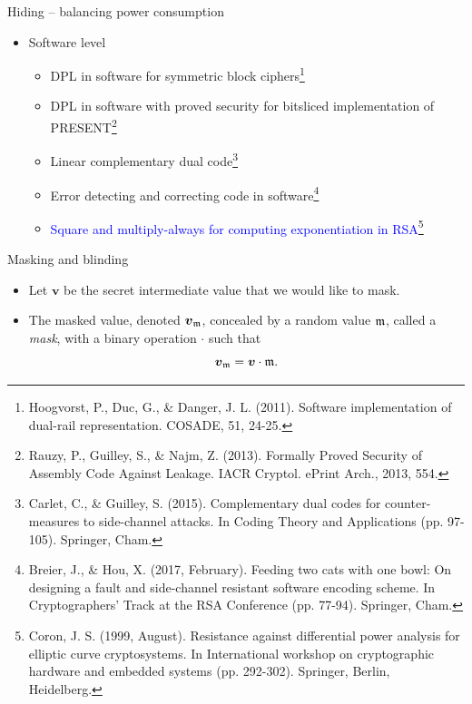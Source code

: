 \begin{frame}{Hiding -- balancing power consumption}
\begin{itemize}
    \item Software level
        \begin{itemize}
            \item DPL in software for symmetric block ciphers\footnote{Hoogvorst, P., Duc, G., \& Danger, J. L. (2011). Software implementation of dual-rail representation. COSADE, 51, 24-25.}
            \item DPL in software with proved security for bitsliced implementation of PRESENT\footnote{Rauzy, P., Guilley, S., \& Najm, Z. (2013). Formally Proved Security of Assembly Code Against Leakage. IACR Cryptol. ePrint Arch., 2013, 554.}
            \item Linear complementary dual code\footnote{Carlet, C., \& Guilley, S. (2015). Complementary dual codes for counter-measures to side-channel attacks. In Coding Theory and Applications (pp. 97-105). Springer, Cham.}
            \item Error detecting and correcting code in software\footnote{Breier, J., \& Hou, X. (2017, February). Feeding two cats with one bowl: On designing a fault and side-channel resistant software encoding scheme. In Cryptographers’ Track at the RSA Conference (pp. 77-94). Springer, Cham.}
            \item \textcolor{blue}{Square and multiply-always for computing exponentiation in RSA}\footnote{Coron, J. S. (1999, August). Resistance against differential power analysis for elliptic curve cryptosystems. In International workshop on cryptographic hardware and embedded systems (pp. 292-302). Springer, Berlin, Heidelberg.}
        \end{itemize}
\end{itemize}
\end{frame}

\begin{frame}{Masking and blinding}
    \begin{itemize}
        \item Let $\boldsymbol{v}$ be the secret intermediate value that we would like to mask.
      \item The masked value, denoted $\boldsymbol{v}_{{\mathfrak m}}$, concealed by a random value ${\mathfrak m}$, called a \textit{mask}, with a binary operation $\cdot$ such that
\[
\boldsymbol{v}_{{\mathfrak m}}=\boldsymbol{v}\cdot{\mathfrak m}.
\]
    \end{itemize}
\end{frame}


